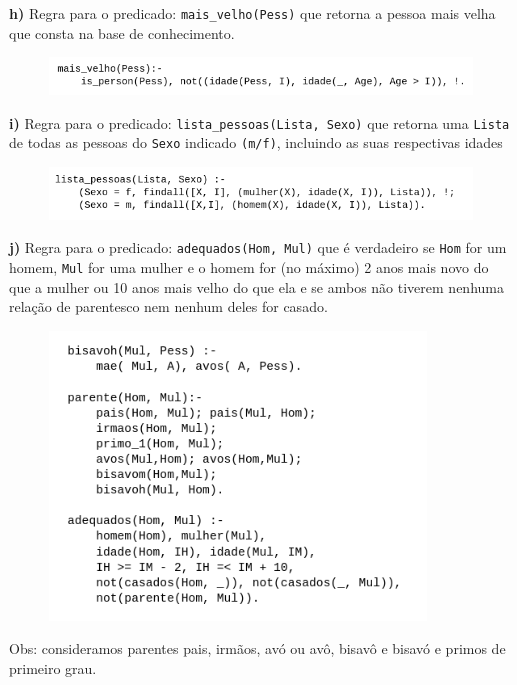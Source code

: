 \documentclass{article}
\begin{document}
    \textbf{h)} Regra para o predicado: \texttt{mais\_velho(Pess)} que retorna a pessoa mais velha que consta na base de conhecimento.

    \begin{figure}[H]
        \centering
        \includegraphics[width=12cm]{img/4h.png}
    \end{figure}

    \textbf{i)} Regra para o predicado: \texttt{lista\_pessoas(Lista, Sexo)} que retorna uma \texttt{Lista} de todas as pessoas do \texttt{Sexo}
    indicado \texttt{(m/f)}, incluindo as suas respectivas idades

    \begin{figure}[H]
        \centering
        \includegraphics[width=12cm]{img/4i.png}
    \end{figure}

    \textbf{j)} Regra para o predicado: \texttt{adequados(Hom, Mul)} que é verdadeiro se \texttt{Hom} for um homem, \texttt{Mul} for uma mulher e o
    homem for (no máximo) 2 anos mais novo do que a mulher ou 10 anos mais velho do que
    ela e se ambos não tiverem nenhuma relação de parentesco nem nenhum deles for casado.

    \begin{figure}[H]
        \centering
        \includegraphics[width=10cm]{img/4j.png}
    \end{figure}

    Obs: consideramos parentes pais, irmãos, avó ou avô, bisavô e 
    bisavó e primos de primeiro grau.
\end{document}
